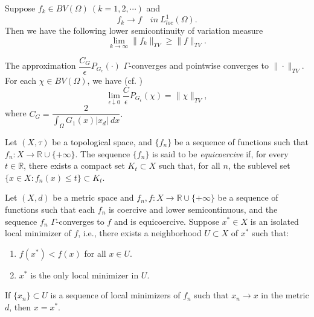\documentclass{amsart}
\begin{document}
\begin{lemma}
\label{TV_ineq}
     Suppose $f_k\in BV(\Omega)\ (k=1,2,\cdots)$ and 
    $$ f_k\to f\quad in\ L_{loc}^1(\Omega).$$
    Then we have the following lower semicontinuity of variation measure
    $$\lim_{k\to \infty}\|f_k\|_{TV}\geq \|f\|_{TV}.$$
\end{lemma}

 \begin{lemma}
 \label{parmeter_gamma}
      The approximation \( \dfrac{C_G}{\epsilon}P_{G_\epsilon}(\cdot) \) \(\Gamma\)-converges and  pointwise converges to \(\|\cdot\|_{TV}\). For each $\chi\in BV(\Omega)$, we have (cf. \cite{Maz})
     $$\lim_{\epsilon\downarrow0}\dfrac{C}{\epsilon}P_{G_\epsilon}(\chi)=\|\chi\|_{TV},$$
     where $C_G=\dfrac{2}{\int_\Omega G_1(x)|x_d|\ dx}.$
 \end{lemma}
\begin{definition}
    Let \( (X, \tau) \) be a topological space, and \( \{f_n\} \) be a sequence of functions such that \( f_n: X \to \mathbb{R} \cup \{+\infty\} \). The sequence \( \{f_n\} \) is said to be \emph{equicoercive} if, for every \( t \in \mathbb{R} \), there exists a compact set \( K_t \subset X \) such that, for all \( n \), the sublevel set \( \{ x \in X : f_n(x) \leq t \} \subset K_t \).
\end{definition}

 \begin{lemma}
    \label{gamma_convergence}
    Let \( (X, d) \) be a metric space and \( f_n, f: X \to \mathbb{R} \cup \{+\infty\} \) be a sequence of functions such that each \(f_n\) is coercive and lower semicontinuous, and the sequence \(f_n\) \(\Gamma\)-converges to \(f\) and is equicoercive. Suppose \( x^* \in X \) is an isolated local minimizer of \( f \), i.e., there exists a neighborhood \( U \subset X \) of \( x^* \) such that:
    \begin{enumerate}
        \item \( f(x^*) < f(x) \) for all \( x \in U \).
        \item \( x^* \) is the only local minimizer in \( U \).
    \end{enumerate}
    If \( \{x_n\} \subset U \) is a sequence of local minimizers of \( f_n \) such that \( x_n \to x \) in the metric \( d \), then \( x = x^* \).
 \end{lemma}
 
 
 
\end{document}
